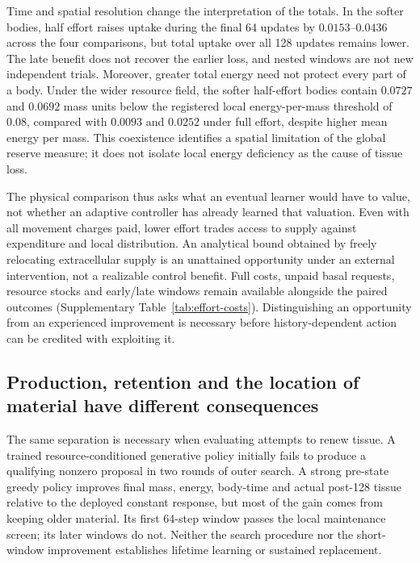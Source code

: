 Time and spatial resolution change the interpretation of the totals. In the softer bodies, half effort raises uptake during the final 64 updates by $0.0153$--$0.0436$ across the four comparisons, but total uptake over all 128 updates remains lower. The late benefit does not recover the earlier loss, and nested windows are not new independent trials. Moreover, greater total energy need not protect every part of a body. Under the wider resource field, the softer half-effort bodies contain $0.0727$ and $0.0692$ mass units below the registered local energy-per-mass threshold of $0.08$, compared with $0.0093$ and $0.0252$ under full effort, despite higher mean energy per mass. This coexistence identifies a spatial limitation of the global reserve measure; it does not isolate local energy deficiency as the cause of tissue loss.

The physical comparison thus asks what an eventual learner would have to value, not whether an adaptive controller has already learned that valuation. Even with all movement charges paid, lower effort trades access to supply against expenditure and local distribution. An analytical bound obtained by freely relocating extracellular supply is an unattained opportunity under an external intervention, not a realizable control benefit. Full costs, unpaid basal requests, resource stocks and early/late windows remain available alongside the paired outcomes (Supplementary Table~\ref{tab:effort-costs}). Distinguishing an opportunity from an experienced improvement is necessary before history-dependent action can be credited with exploiting it.

\subsection*{Production, retention and the location of material have different consequences}

The same separation is necessary when evaluating attempts to renew tissue. A trained resource-conditioned generative policy initially fails to produce a qualifying nonzero proposal in two rounds of outer search. A strong pre-state greedy policy improves final mass, energy, body-time and actual post-128 tissue relative to the deployed constant response, but most of the gain comes from keeping older material. Its first 64-step window passes the local maintenance screen; its later windows do not. Neither the search procedure nor the short-window improvement establishes lifetime learning or sustained replacement.

